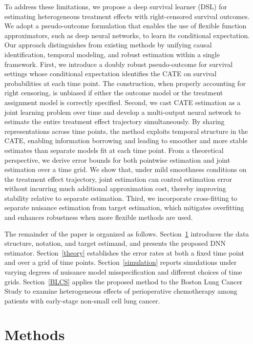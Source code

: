 \documentclass{article}
\begin{document}
   To address these limitations, we propose a deep survival learner (DSL) for estimating heterogeneous treatment effects with right-censored survival outcomes. We adopt a pseudo-outcome formulation that enables the use of flexible function approximators, such as deep neural networks, to learn its conditional expectation. Our approach distinguishes from existing methods by unifying causal identification, temporal modeling, and robust estimation within a single framework.  First, we introduce a doubly robust pseudo-outcome for survival settings whose conditional expectation identifies the CATE on survival probabilities at each time point. The construction, when properly accounting for right censoring,  is unbiased  if either the outcome model or the treatment assignment model is correctly specified.
Second, we cast CATE estimation as a joint learning problem over time and develop a multi-output neural network to estimate the entire treatment effect trajectory simultaneously. By sharing representations across time points, the method exploits temporal structure in the CATE, enabling information borrowing and leading to smoother and more stable estimates than separate models fit at each time point.
From a theoretical perspective, we  derive error bounds for both pointwise estimation and joint estimation over a time grid. We show that, under mild smoothness conditions on the treatment effect trajectory, joint estimation can control estimation error without incurring much additional approximation cost, thereby improving stability relative to separate estimation. Third, we incorporate cross-fitting to separate nuisance estimation from target estimation, which mitigates overfitting and enhances robustness when more flexible methods are used.

 The remainder of the paper is organized as follows. Section~\ref{methods} introduces the data structure, notation, and target estimand, and presents the proposed DNN estimator. Section~\ref{theory} establishes the error rates at both a fixed time point and over a grid of time points. Section~\ref{simulation} reports simulations  under varying degrees of nuisance model misspecification and different choices of time grids. Section~\ref{BLCS} applies the proposed method to the Boston Lung Cancer Study to examine heterogeneous effects of perioperative chemotherapy among patients with early-stage non-small cell lung cancer.

\section{Methods}
\label{methods}
\end{document}
